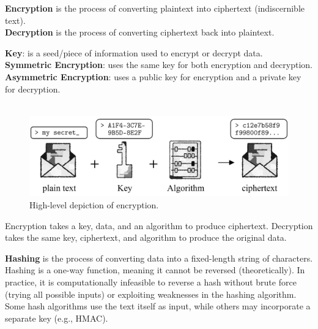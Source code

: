 \newpage 

\begin{Def}[Encryption]

    \textbf{Encryption} is the process of converting plaintext into ciphertext (indiscernible text).\\
    \textbf{Decryption} is the process of converting ciphertext back into plaintext.

\end{Def}
\begin{Def}
    
    \textbf{Key}: is a seed/piece of information used to encrypt or decrypt data.\\
    \textbf{Symmetric Encryption}: uses the same key for both encryption and decryption.\\
    \textbf{Asymmetric Encryption}: uses a public key for encryption and a private key for decryption.\\
    ${}$ \hfill \cite{adetunji_symmetric_asymmetric_encryption}
\end{Def}

\vspace{-1em}
\begin{figure}[h!]
    \centering
    \includegraphics[width=1\textwidth]{Sections/sec/encrypt.png}
    \caption{High-level depiction of encryption.}
    \label{fig:encryption}
\end{figure}

\noindent
Encryption takes a key, data, and an algorithm to produce ciphertext.
Decryption takes the same key, ciphertext, and algorithm to produce the original data.

\vspace{1em}
\begin{Def}[Hashing]
    \textbf{Hashing} is the process of converting data into a fixed-length string of characters.
    Hashing is a one-way function, meaning it cannot be reversed (theoretically). In practice, 
    it is computationally infeasible to reverse a hash without brute force (trying all possible inputs) 
    or exploiting weaknesses in the hashing algorithm. Some hash algorithms use the text itself 
    as input, while others may incorporate a separate key (e.g., HMAC).
\end{Def}

